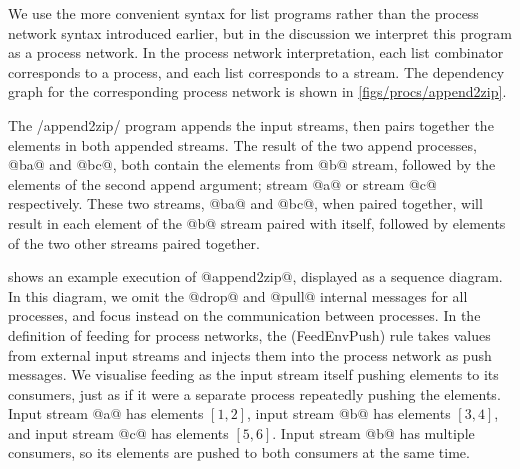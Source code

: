We use the more convenient syntax for list programs rather than the process network syntax introduced earlier, but in the discussion we interpret this program as a process network.
In the process network interpretation, each list combinator corresponds to a process, and each list corresponds to a stream.
The dependency graph for the corresponding process network is shown in \cref{figs/procs/append2zip}.



The \Hs/append2zip/ program appends the input streams, then pairs together the elements in both appended streams.
The result of the two append processes, @ba@ and @bc@, both contain the elements from @b@ stream, followed by the elements of the second append argument; stream @a@ or stream @c@ respectively.
These two streams, @ba@ and @bc@, when paired together, will result in each element of the @b@ stream paired with itself, followed by elements of the two other streams paired together.


 shows an example execution of @append2zip@, displayed as a sequence diagram.
In this diagram, we omit the @drop@ and @pull@ internal messages for all processes, and focus instead on the communication between processes.
In the definition of feeding for process networks, the (FeedEnvPush) rule takes values from external input streams and injects them into the process network as push messages.
We visualise feeding as the input stream itself pushing elements to its consumers, just as if it were a separate process repeatedly pushing the elements.
Input stream @a@ has elements $[1, 2]$, input stream @b@ has elements $[3, 4]$, and input stream @c@ has elements $[5, 6]$.
Input stream @b@ has multiple consumers, so its elements are pushed to both consumers at the same time.


